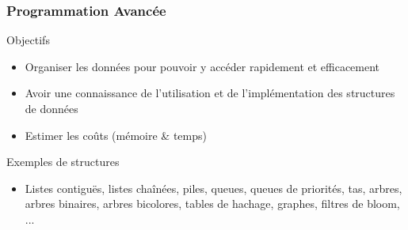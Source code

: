 \documentclass[12pt,svgnames]{beamer}
\begin{document}
\begin{frame}
	\frametitle{Programmation Avancée}
	\begin{block}{Objectifs}
		\begin{itemize}
		\item Organiser les données pour pouvoir y accéder rapidement et efficacement
		\item Avoir une connaissance de l'utilisation et de l'implémentation des structures de données
		\item Estimer les coûts (mémoire \& temps)
		\end{itemize}
	\end{block}{}
	\begin{block}{Exemples de structures}
		\begin{itemize}
		\item Listes contiguës, listes chaînées, piles, queues, queues de priorités, tas, arbres, arbres binaires, arbres bicolores, tables de hachage, graphes, filtres de bloom, ...
		\end{itemize}
	\end{block}
\end{frame}
\end{document}
